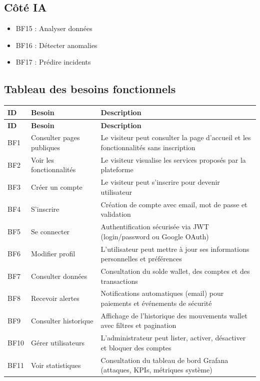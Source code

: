 \documentclass[12pt,a4paper]{report}
\begin{document}
\subsection*{Côté IA}
\begin{itemize}[leftmargin=*,label=--]
\item BF15 : Analyser données
\item BF16 : Détecter anomalies
\item BF17 : Prédire incidents
\end{itemize}

\subsection{Tableau des besoins fonctionnels}
\begin{longtable}{|p{1.2cm}|p{4cm}|p{9cm}|}
\hline
\textbf{ID} & \textbf{Besoin} & \textbf{Description} \\
\hline
\endfirsthead
\hline
\textbf{ID} & \textbf{Besoin} & \textbf{Description} \\
\hline
\endhead
\hline
\endfoot
BF1 & Consulter pages publiques & Le visiteur peut consulter la page d'accueil et les fonctionnalités sans inscription \\
\hline
BF2 & Voir les fonctionnalités & Le visiteur visualise les services proposés par la plateforme \\
\hline
BF3 & Créer un compte & Le visiteur peut s'inscrire pour devenir utilisateur \\
\hline
BF4 & S'inscrire & Création de compte avec email, mot de passe et validation \\
\hline
BF5 & Se connecter & Authentification sécurisée via JWT (login/password ou Google OAuth) \\
\hline
BF6 & Modifier profil & L'utilisateur peut mettre à jour ses informations personnelles et préférences \\
\hline
BF7 & Consulter données & Consultation du solde wallet, des comptes et des transactions \\
\hline
BF8 & Recevoir alertes & Notifications automatiques (email) pour paiements et événements de sécurité \\
\hline
BF9 & Consulter historique & Affichage de l'historique des mouvements wallet avec filtres et pagination \\
\hline
BF10 & Gérer utilisateurs & L'administrateur peut lister, activer, désactiver et bloquer des comptes \\
\hline
BF11 & Voir statistiques & Consultation du tableau de bord Grafana (attaques, KPIs, métriques système) \\

\end{longtable}
\end{document}
